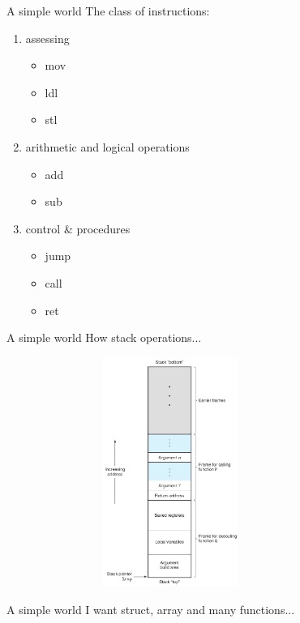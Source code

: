 \documentclass[UKenglish]{beamer}
\begin{document}
\begin{frame}{A simple world}
  The class of instructions:
  \begin{enumerate}
  \item assessing
    \begin{itemize}
    \item mov
    \item ldl
    \item stl
    \end{itemize}
  \item arithmetic and logical operations
    \begin{itemize}
  \item add
  \item sub
    \end{itemize}
  \item control \& procedures
    \begin{itemize}
  \item jump
  \item call
  \item ret
    \end{itemize}
  \end{enumerate}
\end{frame}

\begin{frame}{A simple world}
  How stack operations...
  \begin{center}
    \includegraphics[width = 0.8\textwidth, height=7.5cm]{stack.png}
  \end{center}
\end{frame}

\begin{frame}{A simple world}
  I want struct, array and many functions...
\end{frame}
\end{document}
